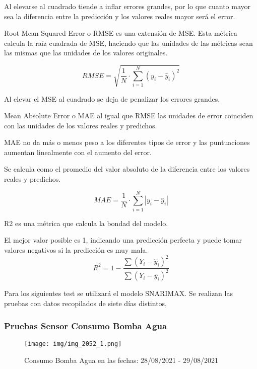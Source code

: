Al elevarse al cuadrado tiende a inflar errores grandes, por lo que cuanto mayor sea la diferencia entre la predicción y los valores reales mayor será el error.


Root Mean Squared Error o RMSE es una extensión de MSE. Esta métrica calcula la raíz cuadrada de MSE, haciendo que las unidades de las métricas sean las mismas que las unidades de los valores originales.

\begin{equation*}
    RMSE = \sqrt{\frac{1}{N} \cdot \sum_{i=1}^{N}(y_i - \hat{y}_i)^2} 
\end{equation*}

Al elevar el MSE al cuadrado se deja de penalizar los errores grandes,


Mean Absolute Error o MAE al igual que RMSE las unidades de error coinciden con las unidades de los valores reales y predichos.

MAE no da más o menos peso a los diferentes tipos de error y las puntuaciones aumentan linealmente con el aumento del error.

Se calcula como el promedio del valor absoluto de la diferencia entre los valores reales y predichos.

\begin{equation*}
    MAE = \frac{1}{N} \cdot \sum_{i=1}^{N}|y_i - \hat{y}_i| 
\end{equation*}


R2 es una métrica que calcula la bondad del modelo.

El mejor valor posible es 1, indicando una predicción perfecta y puede tomar valores negativos si la predicción es muy mala. 
\begin{equation*}
    R^2 = 1 - \frac{\sum(Y_i - \hat{y}_i)^2}{\sum(Y_i - \bar{y}_i)^2}
\end{equation*}


Para los siguientes test se utilizará el modelo SNARIMAX. Se realizan las pruebas con datos 
recopilados de siete días distintos, 
\subsubsection{Pruebas Sensor Consumo Bomba Agua}

\begin{figure}[h]
	\centering
	\texttt{[image: img/img\_2052\_1.png]}
	\caption{Consumo Bomba Agua en las fechas: 28/08/2021 - 29/08/2021}
	\label{img_prediccion_sensor2051}
\end{figure}

